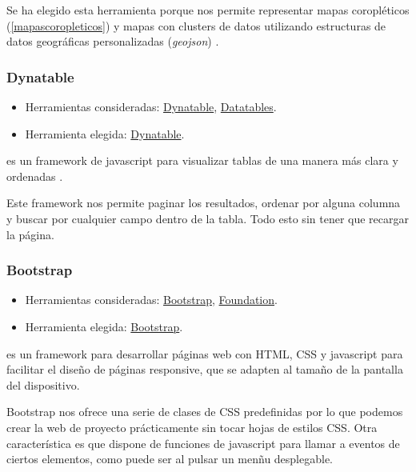 Se ha elegido esta herramienta porque nos permite representar mapas coropléticos (\ref{mapascoropleticos}) y mapas con clusters de datos \cite{misc:foliumcluster} utilizando estructuras de datos geográficas personalizadas (\textit{geojson}) \cite{docs:geojson}.

\subsubsection{Dynatable}

\begin{itemize}
	\tightlist
	\item
	Herramientas consideradas:
	\href{https://www.dynatable.com/}{Dynatable}, 
	\href{https://datatables.net/}{Datatables}.
	\item
	Herramienta elegida:
	\href{https://www.dynatable.com/}{Dynatable}.
\end{itemize}

 es un framework de javascript para visualizar tablas de una manera más clara y ordenadas \cite{docs:dynatable}.

Este framework nos permite paginar los resultados, ordenar por alguna columna y buscar por cualquier campo dentro de la tabla. Todo esto sin tener que recargar la página.

\subsubsection{Bootstrap}

\begin{itemize}
	\tightlist
	\item
	Herramientas consideradas:
	\href{https://getbootstrap.com/}{Bootstrap}, 
	\href{https://foundation.zurb.com/}{Foundation}.
	\item
	Herramienta elegida:
	\href{https://getbootstrap.com/}{Bootstrap}.
\end{itemize}

 es un framework para desarrollar páginas web con HTML, CSS y javascript para facilitar el diseño de páginas responsive, que se adapten al tamaño de la pantalla del dispositivo.

Bootstrap nos ofrece una serie de clases de CSS predefinidas por lo que podemos crear la web de proyecto prácticamente sin tocar hojas de estilos CSS. Otra característica es que dispone de funciones de javascript para llamar a eventos de ciertos elementos, como puede ser al pulsar un menñu desplegable.

